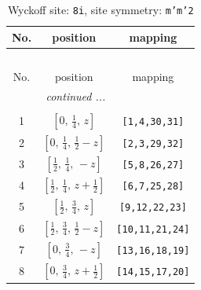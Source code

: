 \documentclass[fleqn,8pt]{jsarticle}
\begin{document}
\begin{longtable}{ccc}
\caption{Wyckoff site: {\tt 8i}, site symmetry: {\tt m'm'2}}
 \\
 \hline \hline
No. & position & mapping \\ \hline \endfirsthead

\multicolumn{2}{l}{\tablename\ \thetable{}} \\
 \hline \hline
No. & position & mapping \\ \hline \endhead

 \hline \hline
\multicolumn{2}{r}{\footnotesize\it continued ...} \\ \endfoot

 \hline \hline
\multicolumn{2}{r}{} \\ \endlastfoot

1 & $\left[ 0,\, \frac{1}{4},\, z \right]$ & {\tt [1,4,30,31]} \\ \hline
2 & $\left[ 0,\, \frac{1}{4},\, \frac{1}{2} - z \right]$ & {\tt [2,3,29,32]} \\ \hline
3 & $\left[ \frac{1}{2},\, \frac{1}{4},\, - z \right]$ & {\tt [5,8,26,27]} \\ \hline
4 & $\left[ \frac{1}{2},\, \frac{1}{4},\, z + \frac{1}{2} \right]$ & {\tt [6,7,25,28]} \\ \hline
5 & $\left[ \frac{1}{2},\, \frac{3}{4},\, z \right]$ & {\tt [9,12,22,23]} \\ \hline
6 & $\left[ \frac{1}{2},\, \frac{3}{4},\, \frac{1}{2} - z \right]$ & {\tt [10,11,21,24]} \\ \hline
7 & $\left[ 0,\, \frac{3}{4},\, - z \right]$ & {\tt [13,16,18,19]} \\ \hline
8 & $\left[ 0,\, \frac{3}{4},\, z + \frac{1}{2} \right]$ & {\tt [14,15,17,20]} \\
\end{longtable}
\renewcommand{\arraystretch}{1.2}
\end{document}

